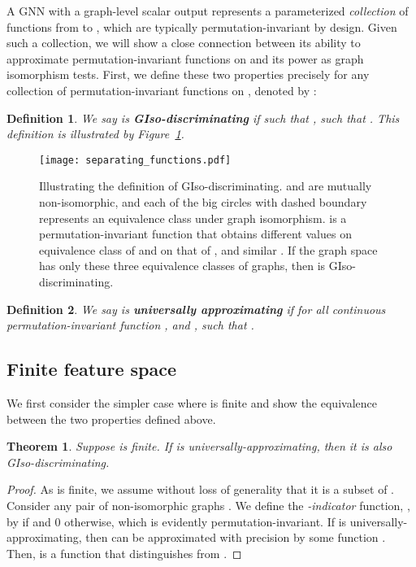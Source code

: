 \documentclass{article}
\newtheorem{theorem}{Theorem}
\newtheorem{definition}{Definition}
\begin{document}
A GNN with a graph-level scalar output represents a parameterized \emph{collection} of functions from  to , which are typically permutation-invariant by design.
Given such a collection, we will show a close connection between its ability to approximate 
 permutation-invariant functions on  and its power as graph isomorphism tests.  
First, we define these two properties precisely for any collection of permutation-invariant functions on , denoted by :
\begin{definition}
\label{pd}
We say  is \textbf{GIso-discriminating} if  such that ,   such that . This definition is illustrated by Figure~\ref{fig:giso}. 
\end{definition}
\begin{figure}
\label{fig:giso}
    \centering
    \texttt{[image: separating\_functions.pdf]}
\caption{Illustrating the definition of GIso-discriminating.  and  are mutually non-isomorphic, and each of the big circles with dashed boundary represents an equivalence class under graph isomorphism.  is a permutation-invariant function that obtains different values on equivalence class of  and on that of , and similar . If the graph space has only these three equivalence classes of graphs, then  is GIso-discriminating.}
\end{figure}
\begin{definition}
\label{def:ua}
We say  is \textbf{universally approximating} if for all continuous permutation-invariant function , and ,  such that .
\end{definition}

\subsection{Finite feature space}
We first consider the simpler case where  is finite and show the equivalence between the two properties defined above.
\begin{theorem}
\label{UA2PD}
Suppose  is finite. If  is universally-approximating, then it is also GIso-discriminating.
\end{theorem}
\begin{proof}
As  is finite, we assume without loss of generality that it is a subset of . Consider any pair of non-isomorphic graphs . We define the \emph{-indicator} function, , by  if   and 0 otherwise, which is evidently permutation-invariant. If  is universally-approximating, then  can be approximated with precision  by some function . Then,  is a function that distinguishes  from .
\end{proof}
\end{document}
